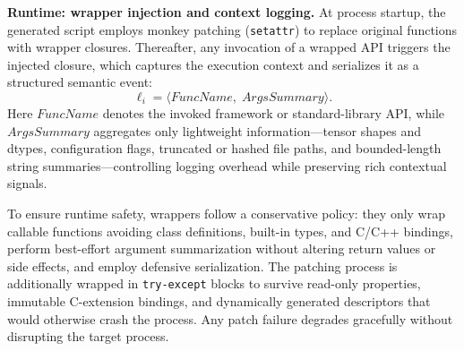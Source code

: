 \begin{algorithm}[t!]
\caption{Automated Dynamic Instrumentation Logic}
\label{alg:instrumentation}


\end{algorithm}

\noindent \textbf{Runtime: wrapper injection and context logging.}
At process startup, the generated script employs monkey patching (\texttt{setattr}) to replace original functions with wrapper closures. Thereafter, any invocation of a wrapped API triggers the injected closure, which captures the execution context and serializes it as a structured semantic event:
\begin{equation}
\ell_i = \langle \textit{FuncName},\; \textit{ArgsSummary} \rangle.
\end{equation}
Here $\textit{FuncName}$ denotes the invoked framework or standard-library API, while $\textit{ArgsSummary}$ aggregates only lightweight information—tensor shapes and dtypes, configuration flags, truncated or hashed file paths, and bounded-length string summaries—controlling logging overhead while preserving rich contextual signals.

To ensure runtime safety, wrappers follow a conservative policy: they only wrap callable functions avoiding class definitions, built-in types, and C/C++ bindings, perform best-effort argument summarization without altering return values or side effects, and employ defensive serialization. The patching process is additionally wrapped in \texttt{try-except} blocks to survive read-only properties, immutable C-extension bindings, and dynamically generated descriptors that would otherwise crash the process. Any patch failure degrades gracefully without disrupting the target process.

